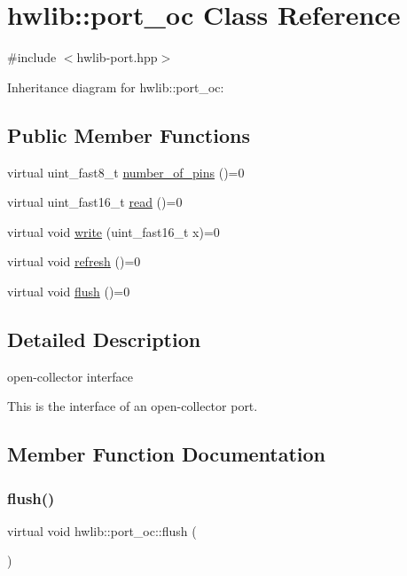 \hypertarget{classhwlib_1_1port__oc}{}\section{hwlib\+:\+:port\+\_\+oc Class Reference}
\label{classhwlib_1_1port__oc}


{\ttfamily \#include $<$hwlib-\/port.\+hpp$>$}



Inheritance diagram for hwlib\+:\+:port\+\_\+oc\+:
\subsection*{Public Member Functions}
\begin{DoxyCompactItemize}
\item 
virtual uint\+\_\+fast8\+\_\+t \hyperlink{classhwlib_1_1port__oc_a44d0dbfde290ad17237ad70c09a4c402}{number\+\_\+of\+\_\+pins} ()=0
\item 
virtual uint\+\_\+fast16\+\_\+t \hyperlink{classhwlib_1_1port__oc_a422b02326f14332df44863adced18427}{read} ()=0
\item 
virtual void \hyperlink{classhwlib_1_1port__oc_aa5889aedda709f045730db9859e4fcf4}{write} (uint\+\_\+fast16\+\_\+t x)=0
\item 
virtual void \hyperlink{classhwlib_1_1port__oc_aa4488183f5cf241ba48ad4dd1a89e42a}{refresh} ()=0
\item 
virtual void \hyperlink{classhwlib_1_1port__oc_a49b64bd24431b35e92e208df84327dae}{flush} ()=0
\end{DoxyCompactItemize}


\subsection{Detailed Description}
open-\/collector interface

This is the interface of an open-\/collector port. 

\subsection{Member Function Documentation}
\mbox{\label{classhwlib_1_1port__oc_a49b64bd24431b35e92e208df84327dae}} 
\subsubsection{\texorpdfstring{flush()}{flush()}}
{\footnotesize\ttfamily virtual void hwlib\+::port\+\_\+oc\+::flush (\begin{DoxyParamCaption}{ }\end{DoxyParamCaption})\hspace{0.3cm}{\ttfamily [pure virtual]}}





